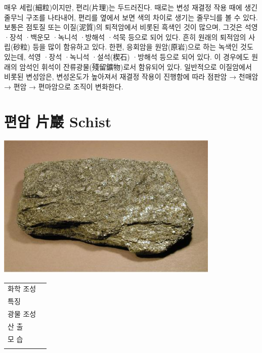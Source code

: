 \documentclass[12pt, a4paper, twoside]{book}
\begin{document}
				매우 세립(細粒)이지만, 편리(片理)는 두드러진다. 
				때로는 변성 재결정 작용 때에 생긴 줄무늬 구조를 나타내어, 편리를 옆에서 보면 색의 차이로 생기는 줄무늬를 볼 수 있다. 
				보통은 점토질 또는 이질(泥質)의 퇴적암에서 비롯된 흑색인 것이 많으며, 그것은 석영 ·장석 ·백운모 ·녹니석 ·방해석 ·석묵 등으로 되어 있다. 
				흔히 원래의 퇴적암의 사립(砂粒) 등을 많이 함유하고 있다. 
				한편, 응회암을 원암(原岩)으로 하는 녹색인 것도 있는데, 석영 ·장석 ·녹니석 ·설석(楔石) ·방해석 등으로 되어 있다. 
				이 경우에도 원래의 암석인 휘석이 잔류광물(殘留鑛物)로서 함유되어 있다. 
				일반적으로 이질암에서 비롯된 변성암은, 변성온도가 높아져서 재결정 작용이 진행함에 따라 점판암 → 천매암 → 편암 → 편마암으로 조직이 변화한다. 










	\clearpage
	\section{편암 片巖 Schist   }



				\begin{center}
				\includegraphics[width=0.8\textwidth]{./fig/schist_0001.jpg}
				\end{center}


				\begin{tabu} to 1.0\textwidth { X[l, 1.0] X[l, 3.0] }
				\tabucline[0.2ex]{-}		
				화학  조성		&\\
				특징				&\\
				광물  조성		&\\
				산      출		&\\
				모      습		&\\
				\tabucline[0.1ex]{-}		
				\end{tabu} 
\end{document}
